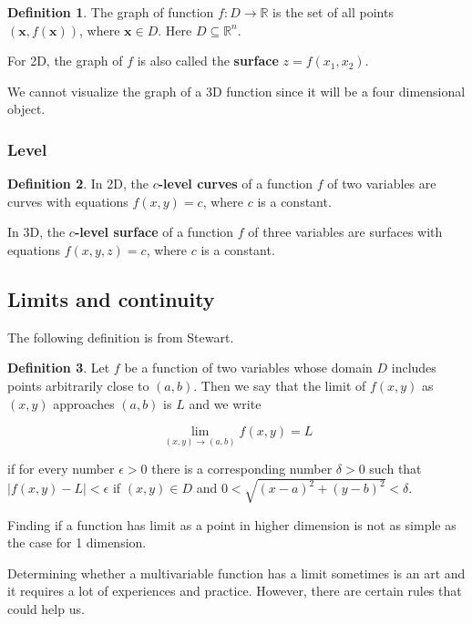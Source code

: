 \documentclass[
]{article}
\theoremstyle{definition}
\newtheorem{definition}{Definition}[section]
\theoremstyle{definition}
\theoremstyle{definition}
\theoremstyle{definition}
\theoremstyle{remark}
\begin{document}
\begin{definition}
The graph of function \(f:D \to \mathbb{R}\) is the set of all points
\((\mathbf{x}, f(\mathbf{x}))\), where \(\mathbf{x}\in D\).
Here \(D\subseteq \mathbb{R}^n\).
\end{definition}

For 2D, the graph of \(f\) is also called the \textbf{surface} \(z = f(x_1,x_2)\).

We cannot visualize the graph of a 3D function since it will be a four dimensional object.

\hypertarget{level}{%
\subsubsection{Level}\label{level}}

\begin{definition}
In 2D, the \textbf{\(c\)-level curves} of a function \(f\) of two variables are curves with equations
\(f(x,y) = c\), where \(c\) is a constant.

In 3D, the \textbf{\(c\)-level surface} of a function \(f\) of three variables are surfaces
with equations \(f(x,y,z) = c\), where \(c\) is a constant.
\end{definition}

\hypertarget{limits-and-continuity}{%
\subsection{Limits and continuity}\label{limits-and-continuity}}

The following definition is from Stewart.

\begin{definition}
Let \(f\) be a function of two variables whose domain \(D\) includes points arbitrarily close to \((a,b)\). Then we say that the limit of \(f(x,y)\) as \((x,y)\) approaches \((a,b)\) is \(L\) and we write

\[\lim_{(x,y)\to(a,b)} f(x,y) = L\]

if for every number \(\epsilon > 0\) there is a corresponding number \(\delta > 0\) such that
\(|f(x,y) - L| < \epsilon\)
if \((x,y) \in D\) and \(0 < \sqrt{(x-a)^2 + (y-b)^2} < \delta\).
\end{definition}

Finding if a function has limit as a point in higher dimension is not as simple as
the case for 1 dimension.

Determining whether a multivariable function has a limit sometimes is an art
and it requires a lot of experiences and practice.
However, there are certain rules that could help us.
\end{document}
